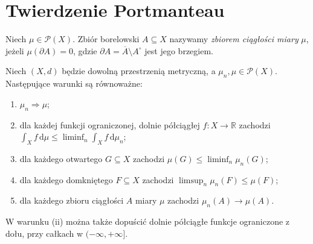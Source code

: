 \section{Twierdzenie Portmanteau}
\begin{definicja}
\label{def:continuity-set-22}
Niech $\mu\in\mathcal P(X)$. Zbiór borelowski
$A\subseteq X$ nazywamy \emph{zbiorem ciągłości miary}
$\mu$, jeżeli $\mu(\partial A)=0$, gdzie
$\partial A=\overline A\setminus A^\circ$ jest jego brzegiem.
\end{definicja}

\begin{twierdzenie}[Portmanteau]
\label{thm:portmanteau-22}
Niech $(X,d)$ będzie dowolną przestrzenią metryczną,
a $\mu_n,\mu\in\mathcal P(X)$. Następujące warunki
są równoważne:
\begin{enumerate}[label=(\roman*)]
\item $\mu_n\Rightarrow\mu$;
\item dla każdej funkcji ograniczonej, dolnie półciągłej
$f:X\to\mathbb R$ zachodzi
$\int_Xf\,\mathrm d\mu\le\liminf_n\int_Xf\,\mathrm d\mu_n$;
\item dla każdego otwartego $G\subseteq X$ zachodzi
$\mu(G)\le\liminf_n\mu_n(G)$;
\item dla każdego domkniętego $F\subseteq X$ zachodzi
$\limsup_n\mu_n(F)\le\mu(F)$;
\item dla każdego zbioru ciągłości $A$ miary $\mu$
zachodzi $\mu_n(A)\to\mu(A)$.
\end{enumerate}
W warunku (ii) można także dopuścić dolnie półciągłe
funkcje ograniczone z dołu, przy całkach w $(-\infty,+\infty]$.
\end{twierdzenie}
